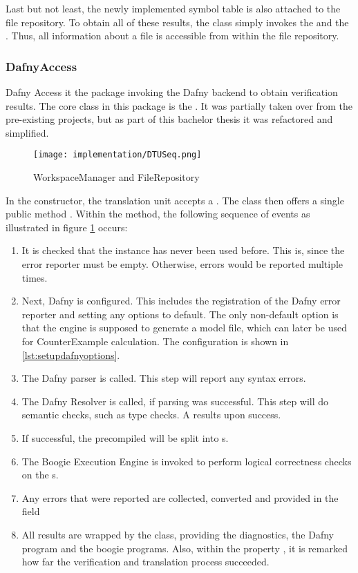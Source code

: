 Last but not least, the newly implemented symbol table is also attached to the file repository.
To obtain all of these results, the class simply invokes the  and the .
Thus, all information about a file is accessible from within the file repository.


\subsubsection{DafnyAccess}
Dafny Access it the package invoking the Dafny backend to obtain verification results.
The core class in this package is the .
It was partially taken over from the pre-existing projects, but as part of this bachelor thesis it was refactored and simplified.\\

\begin{figure}[h]
    \centering
    \texttt{[image: implementation/DTUSeq.png]}
    \caption{WorkspaceManager and FileRepository}
    \label{fig:DTUSeq}
\end{figure}

In the constructor, the translation unit accepts a .
The class then offers a single public method .
Within the method, the following sequence of events as illustrated in figure \ref{fig:DTUSeq} occurs:

\begin{enumerate}
    \item It is checked that the instance has never been used before.
    This is, since the error reporter must be empty.
    Otherwise, errors would be reported multiple times.
    \item Next, Dafny is configured.
    This includes the registration of the Dafny error reporter and setting any options to default.
    The only non-default option is that the engine is supposed to generate a model file, which can later be used for CounterExample calculation.
    The configuration is shown in \ref{lst:setupdafnyoptions}.
    \item The Dafny parser is called.
    This step will report any syntax errors.
    \item The Dafny Resolver is called, if parsing was successful.
    This step will do semantic checks, such as type checks.
    A  results upon success.
    \item If successful, the precompiled  will be split into s.
    \item The Boogie Execution Engine is invoked to perform logical correctness checks on the s.
    \item Any errors that were reported are collected, converted and provided in the field 
    \item All results are wrapped by the  class, providing the diagnostics, the Dafny program and the boogie programs.
    Also, within the property , it is remarked how far the verification and translation process succeeded.
\end{enumerate}


